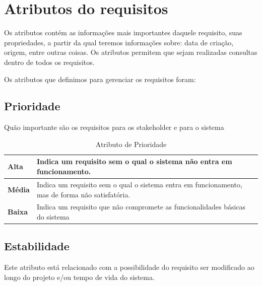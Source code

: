 \section{Atributos do requisitos}

  Os atributos contém as informações mais importantes daquele requisito, suas propriedades, a partir da qual teremos informações sobre:
  data de criação, origem, entre outras coisas. Os atributos permitem que sejam realizadas consultas dentro de todos os requisitos.

  Os atributos que definimos para gerenciar os requisitos foram:

\subsection{Prioridade}

  Quão importante são os requisitos para os stakeholder e para o sistema

  \begin{table}[!htb]
    \centering
    \begin{tabular}{p{5cm}p{10cm}}
      \toprule
      \textbf{Alta}  & Indica um requisito sem o qual o sistema não entra em funcionamento.                             \\ \midrule
      \textbf{Média} & Indica um requisito sem o qual o sistema entra em funcionamento, mas de forma não satisfatória.  \\ \midrule
      \textbf{Baixa} & Indica um requisito que não compromete as funcionalidades básicas do sistema                     \\
      \bottomrule
    \end{tabular}
    \caption{Atributo de Prioridade}
  \end{table}

\subsection{Estabilidade}

  Este atributo está relacionado com a possibilidade do requisito ser modificado ao longo do projeto e/ou tempo de vida do sistema.


